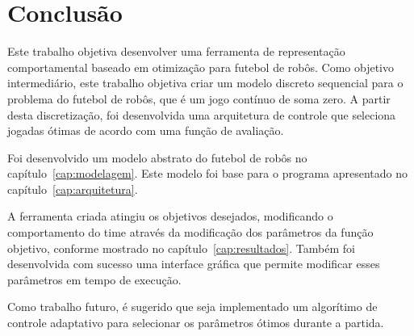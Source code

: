 \chapter*{Conclusão}\label{cap:conclusao}

Este trabalho objetiva desenvolver uma ferramenta de representação
comportamental baseado em otimização para futebol de robôs.
Como objetivo intermediário, este trabalho objetiva criar um modelo discreto
sequencial para o problema do futebol de robôs, que é um jogo contínuo de soma
zero. A partir desta discretização, foi desenvolvida uma arquitetura de
controle que seleciona jogadas ótimas de acordo com uma função de avaliação.

Foi desenvolvido um modelo abstrato do futebol de robôs no
capítulo~\ref{cap:modelagem}. Este modelo foi base para o
programa apresentado no capítulo~\ref{cap:arquitetura}.

A ferramenta criada atingiu os objetivos desejados, modificando o
comportamento do time através da modificação dos parâmetros da função
objetivo, conforme mostrado no capítulo~\ref{cap:resultados}. Também foi
desenvolvida com sucesso uma interface gráfica que permite modificar
esses parâmetros em tempo de execução.

Como trabalho futuro, é sugerido que seja implementado 
um algorítimo de controle adaptativo para selecionar os
parâmetros ótimos durante a partida.

